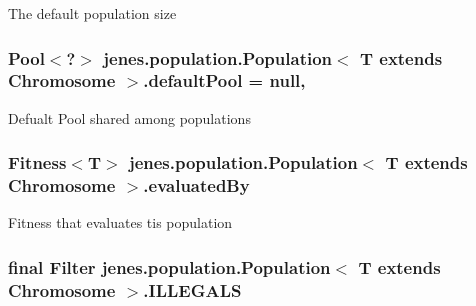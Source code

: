 The default population size \hypertarget{classjenes_1_1population_1_1_population_3_01_t_01extends_01_chromosome_01_4_a03e49f128c364d278832a0d989a11e6f}{
\subsubsection[{default\-Pool}]{\setlength{\rightskip}{0pt plus 5cm}Pool$<$?$>$ jenes.\-population.\-Population$<$ T extends Chromosome $>$.default\-Pool = null\hspace{0.3cm}{\ttfamily [static]}, {\ttfamily [private]}}}\label{classjenes_1_1population_1_1_population_3_01_t_01extends_01_chromosome_01_4_a03e49f128c364d278832a0d989a11e6f}
Defualt Pool shared among populations \hypertarget{classjenes_1_1population_1_1_population_3_01_t_01extends_01_chromosome_01_4_a7c5c43b305c451095a366663cc061f9d}{
\subsubsection[{evaluated\-By}]{\setlength{\rightskip}{0pt plus 5cm}Fitness$<$T$>$ jenes.\-population.\-Population$<$ T extends Chromosome $>$.evaluated\-By\hspace{0.3cm}{\ttfamily [private]}}}\label{classjenes_1_1population_1_1_population_3_01_t_01extends_01_chromosome_01_4_a7c5c43b305c451095a366663cc061f9d}
Fitness that evaluates tis population \hypertarget{classjenes_1_1population_1_1_population_3_01_t_01extends_01_chromosome_01_4_acbb46d951b86374304f72246d3142bce}{
\subsubsection[{I\-L\-L\-E\-G\-A\-L\-S}]{\setlength{\rightskip}{0pt plus 5cm}final Filter jenes.\-population.\-Population$<$ T extends Chromosome $>$.I\-L\-L\-E\-G\-A\-L\-S\hspace{0.3cm}{\ttfamily [static]}}}\label{classjenes_1_1population_1_1_population_3_01_t_01extends_01_chromosome_01_4_acbb46d951b86374304f72246d3142bce}
